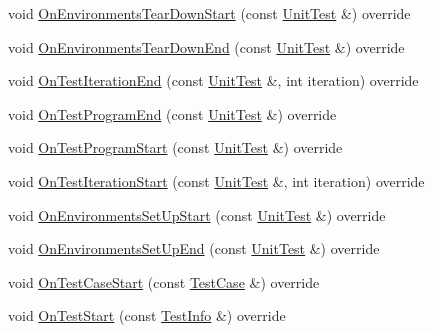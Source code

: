 \begin{DoxyCompactItemize}
void \mbox{\hyperlink{classtesting_1_1internal_1_1_event_recording_listener_aab8379a206927984cdb7b84399a122a5}{On\+Environments\+Tear\+Down\+Start}} (const \mbox{\hyperlink{classtesting_1_1_unit_test}{Unit\+Test}} \&) override
\item 
void \mbox{\hyperlink{classtesting_1_1internal_1_1_event_recording_listener_ab96b8b58a318ebe79df4295e2da6a289}{On\+Environments\+Tear\+Down\+End}} (const \mbox{\hyperlink{classtesting_1_1_unit_test}{Unit\+Test}} \&) override
\item 
void \mbox{\hyperlink{classtesting_1_1internal_1_1_event_recording_listener_a48f6f53c044e8cb6425f9bc7319ddecc}{On\+Test\+Iteration\+End}} (const \mbox{\hyperlink{classtesting_1_1_unit_test}{Unit\+Test}} \&, int iteration) override
\item 
void \mbox{\hyperlink{classtesting_1_1internal_1_1_event_recording_listener_a22952f706a15c028d4b43256602035bb}{On\+Test\+Program\+End}} (const \mbox{\hyperlink{classtesting_1_1_unit_test}{Unit\+Test}} \&) override
\item 
void \mbox{\hyperlink{classtesting_1_1internal_1_1_event_recording_listener_a9cec5ac263fe161de360615422370eec}{On\+Test\+Program\+Start}} (const \mbox{\hyperlink{classtesting_1_1_unit_test}{Unit\+Test}} \&) override
\item 
void \mbox{\hyperlink{classtesting_1_1internal_1_1_event_recording_listener_aeed7e9302e3fc2c182a2f20c174d62b8}{On\+Test\+Iteration\+Start}} (const \mbox{\hyperlink{classtesting_1_1_unit_test}{Unit\+Test}} \&, int iteration) override
\item 
void \mbox{\hyperlink{classtesting_1_1internal_1_1_event_recording_listener_ae192e9289f576fc770b549a575d8e786}{On\+Environments\+Set\+Up\+Start}} (const \mbox{\hyperlink{classtesting_1_1_unit_test}{Unit\+Test}} \&) override
\item 
void \mbox{\hyperlink{classtesting_1_1internal_1_1_event_recording_listener_ada752f5c75723828ed8661c513edbd10}{On\+Environments\+Set\+Up\+End}} (const \mbox{\hyperlink{classtesting_1_1_unit_test}{Unit\+Test}} \&) override
\item 
void \mbox{\hyperlink{classtesting_1_1internal_1_1_event_recording_listener_a3ce90fda790857eb64444038a5b3258f}{On\+Test\+Case\+Start}} (const \mbox{\hyperlink{classtesting_1_1_test_case}{Test\+Case}} \&) override
\item 
void \mbox{\hyperlink{classtesting_1_1internal_1_1_event_recording_listener_ad850af9e4276b9bfba61435b97a02094}{On\+Test\+Start}} (const \mbox{\hyperlink{classtesting_1_1_test_info}{Test\+Info}} \&) override

\end{DoxyCompactItemize}
